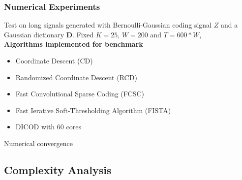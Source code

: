 \documentclass[prez_parietal.tex]{subfiles}
\begin{document}
\begin{frame}

		\frametitle{Numerical Experiments}
		Test on long signals generated with Bernoulli-Gaussian
		coding signal $Z$ and a Gaussian dictionary $\pmb D$.
		Fixed $K = 25$, $W = 200$ and $T = 600*W$,\\[1em]
	
	\textbf{Algorithms implemented for benchmark}
	\begin{itemize}
		\item {\color{cd} Coordinate Descent} (CD) \\
		\item {\color{rcd} Randomized Coordinate Descent} (RCD) \\
		\item Fast Convolutional Sparse Coding (FCSC)\\
		\item {\color{fista}Fast Ierative Soft-Thresholding Algorithm (FISTA)} \\
		\item {\color{dicod} DICOD with $60$ cores}
	\end{itemize}
\end{frame}


\begin{frame}{Numerical convergence}

\end{frame}


\subsection{Complexity Analysis}
\end{document}
